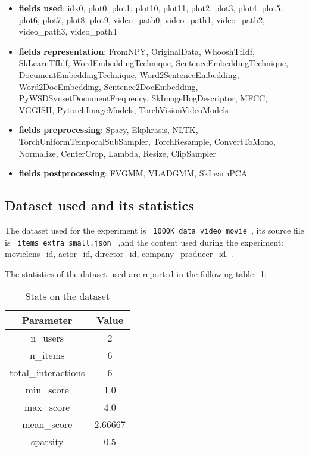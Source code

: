 \documentclass[11pt]{article}
\begin{document}
\begin{itemize}
    \item \textbf{fields used}:  idx0, plot0, plot1, plot10, plot11, plot2, plot3, plot4, plot5, plot6, plot7, plot8, plot9, video\_path0, video\_path1, video\_path2, video\_path3, video\_path4

    \item \textbf{fields representation}:  FromNPY, OriginalData, WhooshTfIdf, SkLearnTfIdf, WordEmbeddingTechnique, SentenceEmbeddingTechnique, DocumentEmbeddingTechnique, Word2SentenceEmbedding, Word2DocEmbedding, Sentence2DocEmbedding, PyWSDSynsetDocumentFrequency, SkImageHogDescriptor, MFCC, VGGISH, PytorchImageModels, TorchVisionVideoModels

    \item \textbf{fields preprocessing}:  Spacy, Ekphrasis, NLTK, TorchUniformTemporalSubSampler, TorchResample, ConvertToMono, Normalize, CenterCrop, Lambda, Resize, ClipSampler

    \item \textbf{fields postprocessing}:  FVGMM, VLADGMM, SkLearnPCA
\end{itemize}





\hfill\break
\subsection{Dataset used and its statistics}
The dataset used for the experiment is  \lstinline[style=verbatim-text]| 1000K data video movie |,
its source file is \lstinline[style=verbatim-text]| items_extra_small.json | ,and the content used during the experiment:
     movielens\_id,
     actor\_id,
     director\_id,
     company\_producer\_id,
.


The statistics of the dataset used are reported in the following table:~\ref{tab:dataset_table}:
\begin{table}[ht]
    \centering
  \begin{tabular}{|c|c|}
    \hline
    \textbf{Parameter}& \textbf{Value} \\ \hline
    n\_users  & 2\\ \hline
    n\_items  & 6\\ \hline
    total\_interactions  & 6\\ \hline
    min\_score  & 1.0\\ \hline
    max\_score  & 4.0\\ \hline
    mean\_score  & 2.66667\\ \hline
    sparsity  & 0.5\\ \hline
  \end{tabular}
   \caption{Stats on the dataset}\label{tab:dataset_table}
\end{table}
\end{document}

